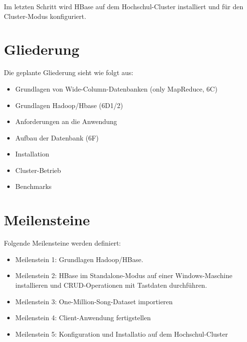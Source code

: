 Im letzten Schritt wird HBase auf dem Hochschul-Cluster installiert und für den Cluster-Modus konfiguriert.

\section{Gliederung}
Die geplante Gliederung sieht wie folgt aus:
\begin{itemize}
	\item Grundlagen von Wide-Column-Datenbanken (only MapReduce, 6C)
	\item Grundlagen Hadoop/Hbase (6D1/2)
	\item Anforderungen an die Anwendung
	\item Aufbau der Datenbank (6F)
	\item Installation
	\item Cluster-Betrieb
	\item Benchmarks
\end{itemize}

\section{Meilensteine}
Folgende Meilensteine werden definiert:
\begin{itemize}
\item Meilenstein 1: Grundlagen Hadoop/HBase.
\item Meilenstein 2: HBase im Standalone-Modus auf einer Windows-Maschine installieren und CRUD-Operationen mit Tastdaten durchführen.
\item Meilenstein 3: One-Million-Song-Dataset importieren
\item Meilenstein 4: Client-Anwendung fertigstellen
\item Meilenstein 5: Konfiguration und Installatio auf dem Hochschul-Cluster
\end{itemize}